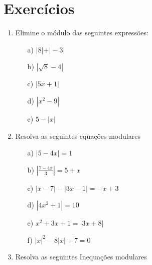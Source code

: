 \section{Exercícios}
\begin{enumerate}

\item Elimine o módulo das seguintes expressões:

\begin{minipage}[t]{.44\textwidth}
\begin{itemize}
\item[a)] $\vert 8 \vert + \vert -3\vert$
\item[b)] $|\sqrt{8}-4|$
\end{itemize}
\end{minipage}
\begin{minipage}[t]{.44\textwidth}
\begin{itemize}
\item[c)] $|5x+1|$
\item[d)]$|x^2-9|$
\item[e)]  $5-|x|$
\end{itemize}
\end{minipage}

\item Resolva as seguintes equações modulares

\begin{minipage}[t]{.44\textwidth}
\begin{itemize}
\item[a)] $ \vert 5-4x\vert=1$
\item[b)] $|\frac{7-4x}{3}|=5+x$
\item[c)]$|x-7|-|3x-1|=-x+3$
\end{itemize}
\end{minipage}
\begin{minipage}[t]{.44\textwidth}
\begin{itemize}
\item[d)] $|4x^2+1|=10$
\item[e)]$x^2+3x+1=|3x+8|$
\item[f)]  $|x|^2-8|x|+7=0$
\end{itemize}
\end{minipage}

\item Resolva as seguintes Inequações modulares


\end{enumerate}
